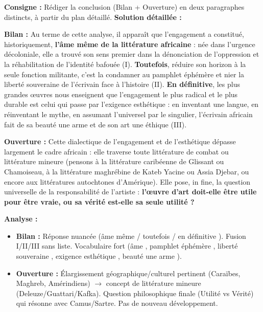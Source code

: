 \documentclass[11pt]{article}
\begin{document}
\begin{exoresolu}
\textbf{Consigne :} Rédiger la conclusion (Bilan + Ouverture) en deux paragraphes distincts, à partir du plan détaillé.
\tcblower
\textbf{Solution détaillée :}

\textbf{Bilan :}
\og Au terme de cette analyse, il apparaît que l'engagement a constitué, historiquement, \textbf{l'âme même de la littérature africaine} : née dans l'urgence décoloniale, elle a trouvé son sens premier dans la dénonciation de l'oppression et la réhabilitation de l'identité bafouée (I). \textbf{Toutefois}, réduire son horizon à la seule fonction militante, c'est la condamner au pamphlet éphémère et nier la liberté souveraine de l'écrivain face à l'histoire (II). \textbf{En définitive}, les plus grandes œuvres nous enseignent que l'engagement le plus radical et le plus durable est celui qui passe par l'exigence esthétique : en inventant une langue, en réinventant le mythe, en assumant l'universel par le singulier, l'écrivain africain fait de sa beauté une arme et de son art une éthique (III). \fg

\textbf{Ouverture :}
\og Cette dialectique de l'engagement et de l'esthétique dépasse largement le cadre africain : elle traverse toute \og littérature de combat \fg ou \og littérature mineure \fg (pensons à la littérature caribéenne de Glissant ou Chamoiseau, à la littérature maghrébine de Kateb Yacine ou Assia Djebar, ou encore aux littératures autochtones d'Amérique). Elle pose, in fine, la question universelle de la responsabilité de l'artiste : \textbf{l'œuvre d'art doit-elle être utile pour être vraie, ou sa vérité est-elle sa seule utilité ?} \fg

\textbf{Analyse :}
\begin{itemize}
    \item \textbf{Bilan :} Réponse nuancée (\og âme même \fg / \og toutefois \fg / \og en définitive \fg). Fusion I/II/III sans liste. Vocabulaire fort (\og âme \fg, \og pamphlet éphémère \fg, \og liberté souveraine \fg, \og exigence esthétique \fg, \og beauté une arme \fg).
    \item \textbf{Ouverture :} Élargissement géographique/culturel pertinent (Caraïbes, Maghreb, Amérindiens) $\rightarrow$ concept de \og littérature mineure \fg (Deleuze/Guattari/Kafka). Question philosophique finale (Utilité vs Vérité) qui résonne avec Camus/Sartre. Pas de nouveau développement.
\end{itemize}
\end{exoresolu}
\end{document}
